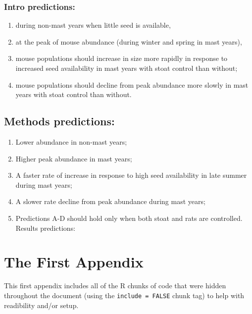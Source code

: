 \hypertarget{intro-predictions}{%
\subsection{Intro predictions:}\label{intro-predictions}}
\begin{enumerate}
\def\labelenumi{\Alph{enumi})}
\item
  during non-mast years when little seed is available,
\item
  at the peak of mouse abundance (during winter and spring in mast years),
\item
  mouse populations should increase in size more rapidly in response to increased seed availability in mast years with stoat control than without;
\item
  mouse populations should decline from peak abundance more slowly in mast years with stoat control than without.
\end{enumerate}
\hypertarget{methods-predictions}{%
\section{Methods predictions:}\label{methods-predictions}}
\begin{enumerate}
\def\labelenumi{\Alph{enumi})}
\item
  Lower abundance in non-mast years;
\item
  Higher peak abundance in mast years;
\item
  A faster rate of increase in response to high seed availability in late summer during mast years;
\item
  A slower rate decline from peak abundance during mast years;
\item
  Predictions A-D should hold only when both stoat and rats are controlled.
  Results predictions:
\end{enumerate}
\appendix

\hypertarget{the-first-appendix}{%
\chapter{The First Appendix}\label{the-first-appendix}}

This first appendix includes all of the R chunks of code that were hidden throughout the document (using the \texttt{include\ =\ FALSE} chunk tag) to help with readibility and/or setup.

